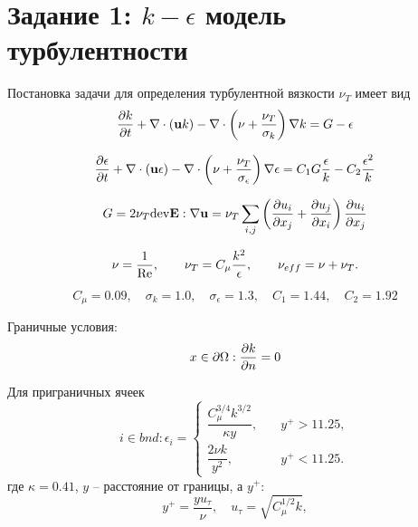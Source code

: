 \section{Задание 1: $k-\epsilon$ модель турбулентности}

Постановка задачи для определения турбулентной вязкости $\nu_T$ имеет вид
\begin{equation}
\frac{\partial k}{\partial t} + \nabla\cdot(\boldsymbol{\rm u} k) - \nabla \cdot \left(\nu + \frac{\nu_T}{\sigma_k}\right)\nabla k = G - \epsilon
\end{equation}

\begin{equation}
\frac{\partial \epsilon}{\partial t} + \nabla\cdot(\boldsymbol{\rm u} \epsilon) - \nabla \cdot \left(\nu + \frac{\nu_T}{\sigma_\epsilon}\right)\nabla \epsilon = 
	C_1 G \frac{\epsilon}{k} - C_2 \frac{\epsilon^2}{k}
\end{equation}

\begin{equation}
G = 2 \nu_T {\rm dev} \boldsymbol{\rm E} : \nabla\boldsymbol{\rm u} = \nu_T \sum_{i,j}\left(\frac{\partial u_i}{\partial x_j} + \frac{\partial u_j}{\partial x_i}\right)\frac{\partial u_i}{\partial x_j}
\end{equation}

\begin{equation}
\nu = \frac{1}{\mathrm{Re}}, \qquad \nu_T = C_\mu\frac{k^2}{\epsilon}, \qquad \nu_{eff} = \nu + \nu_T.
\end{equation}

\begin{equation*}
C_\mu = 0.09, \quad \sigma_k = 1.0, \quad \sigma_\epsilon = 1.3, \quad C_1 = 1.44, \quad C_2 = 1.92
\end{equation*}

Граничные условия:
\begin{equation}
x\in\partial\Omega: \frac{\partial k}{\partial n} = 0
\end{equation}

Для приграничных ячеек
\begin{equation}
i \in bnd: \epsilon_i = \begin{cases}
\dfrac{C_\mu^{3/4} k^{3/2}}{\kappa y}, &\quad y^+ > 11.25, \\[10pt]
\dfrac{2 \nu k}{y^2},                   &\quad y^+ < 11.25.
\end{cases}
\end{equation}
где $\kappa=0.41$, $y$ -- расстояние от границы, а $y^+$:
\begin{equation*}
y^+ = \frac{y u_\tau}{\nu}, \quad u_\tau = \sqrt{C_\mu^{1/2}k},
\end{equation*}

